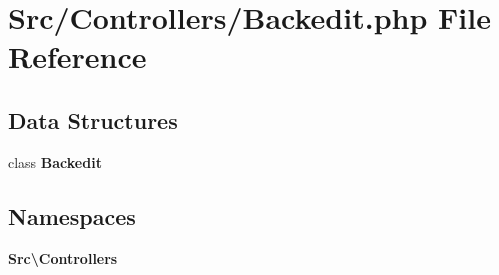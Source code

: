 \section{Src/\+Controllers/\+Backedit.php File Reference}
\label{_backedit_8php}
\subsection*{Data Structures}
\begin{DoxyCompactItemize}
\item 
class \textbf{ Backedit}
\end{DoxyCompactItemize}
\subsection*{Namespaces}
\begin{DoxyCompactItemize}
\item 
 \textbf{ Src\textbackslash{}\+Controllers}
\end{DoxyCompactItemize}
